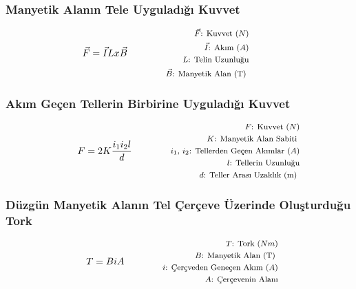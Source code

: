 \subsubsection*{Manyetik Alanın Tele Uyguladığı Kuvvet}
\begin{equation}
    \vec{F} = \vec{I}L x \vec{B} \qquad \qquad \parbox{4cm}{\footnotesize$\begin{aligned}
        \vec{F}\text{: Kuvvet } (N) \\
        \vec{I}\text{: Akım } (A) \\
        L\text{: Telin Uzunluğu} \\
        \vec{B}\text{: Manyetik Alan (T) }
\end{aligned}$}
\end{equation}

\subsubsection*{Akım Geçen Tellerin Birbirine Uyguladığı Kuvvet}
\begin{equation}
    F = 2K \frac{i_1 i_2 l}{d} \qquad \qquad \parbox{4cm}{\footnotesize$\begin{aligned}
        F\text{: Kuvvet } (N) \\
        K\text{: Manyetik Alan Sabiti } \\
        i_1\text{, }i_2\text{: Tellerden Geçen Akımlar } (A) \\
        l\text{: Tellerin Uzunluğu} \\
        d\text{: Teller Arası Uzaklık (m) }
\end{aligned}$}
\end{equation}

\subsubsection*{Düzgün Manyetik Alanın Tel Çerçeve Üzerinde Oluşturduğu Tork}
\begin{equation}
    T = B i A \qquad \qquad \parbox{4cm}{\footnotesize$\begin{aligned}
        T\text{: Tork } (Nm) \\
        B\text{: Manyetik Alan (T) } \\
        i\text{: Çerçveden Geneçen Akım } (A) \\
        A\text{: Çerçevenin Alanı} \\
\end{aligned}$}
\end{equation}

